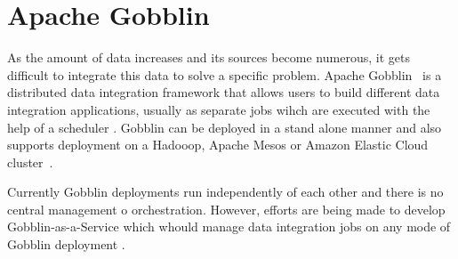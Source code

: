 \section{Apache Gobblin}

As the amount of data increases and its sources become numerous, it
gets difficult to integrate this data to solve a specific
problem. Apache Gobblin~\cite{hid-sp18-www-gobblin} is a distributed
data integration framework that allows users to build different data
integration applications, usually as separate jobs wihch are executed
with the help of a scheduler
\cite{hid-sp18-503-www-gobblin-docs}. Gobblin can be deployed in a
stand alone manner and also supports deployment on a Hadooop, Apache
Mesos or Amazon Elastic Cloud cluster~\cite{hid-sp18-503-gobblin}.

Currently Gobblin deployments run independently of each other and
there is no central management o orchestration. However, efforts are
being made to develop Gobblin-as-a-Service which whould manage data
integration jobs on any mode of Gobblin deployment
\cite{hid-sp18-503-www-gobblin-docs}.
